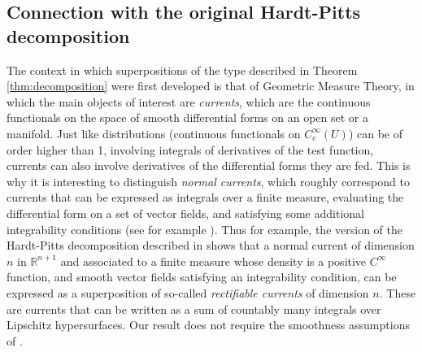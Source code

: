\documentclass{article}
\newcommand{\R}{\mathbb{R}}
\theoremstyle{definition}
\theoremstyle{remark}
\begin{document}
 \subsection{Connection with the original Hardt-Pitts decomposition}
 \label{sec:hardtpitts}
The context in which superpositions of the type described in Theorem \ref{thm:decomposition}  were first developed is that of Geometric Measure Theory, in which the main objects of interest are \emph{currents}, which are the continuous functionals on the space of smooth differential forms on an open set or a manifold. Just like distributions (continuous functionals on $C^\infty_c(U)$) can be of order higher than 1, involving integrals of derivatives of the test function, currents can also involve derivatives of the differential forms they are fed. This is why it is interesting to distinguish \emph{normal currents}, which roughly correspond to currents that can be expressed as integrals over a finite measure, evaluating the differential form on a set of vector fields, and satisfying some additional integrability conditions (see for example \cite{morgan}). Thus for example, the version of the Hardt-Pitts decomposition described in \cite{zworski1988decomposition} shows that a normal current of dimension $n$ in $\R^{n+1}$ and associated to a finite measure whose density is a positive $C^\infty$ function, and smooth vector fields satisfying an integrability condition, can be expressed as a superposition of so-called \emph{rectifiable currents} of dimension $n$. These are currents that can be written as a sum of countably many integrals over Lipschitz hypersurfaces. Our result does not require the smoothness assumptions of \cite{zworski1988decomposition}.
\end{document}
